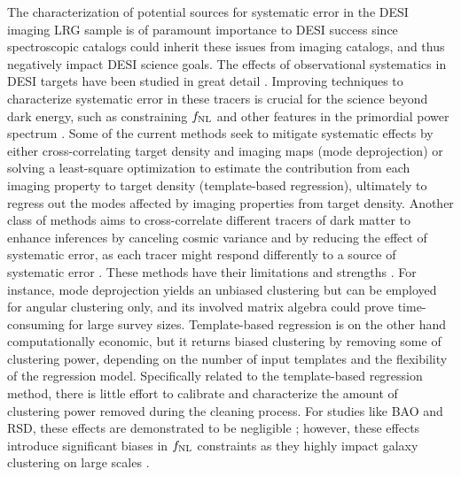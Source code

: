 The characterization of potential sources for systematic error in the DESI imaging LRG sample is of paramount importance to DESI success since spectroscopic catalogs could inherit these issues from imaging catalogs, and thus negatively impact DESI science goals. The effects of observational systematics in DESI targets have been studied in great detail \cite[see, e.g.,][]{kitanidis2020imaging, zhou2021clustering, chaussidon2022angular}. Improving techniques to characterize systematic error in these tracers is crucial for the science beyond dark energy, such as constraining $f_{\rm NL}$ and other features in the primordial power spectrum \citep{beutler2019primordial}. Some of the current methods seek to mitigate systematic effects by either cross-correlating target density and imaging maps (mode deprojection) or solving a least-square optimization to estimate the contribution from each imaging property to target density (template-based regression), ultimately to regress out the modes affected by imaging properties from target density. Another class of methods aims to cross-correlate different tracers of dark matter to enhance inferences by canceling cosmic variance and by reducing the effect of systematic error, as each tracer might respond differently to a source of systematic error \citep[see, e.g.,][]{giannantonio2014improved}. These methods have their limitations and strengths \citep[see, e.g.,][for a review]{2021MNRAS.503.5061W}. For instance, mode deprojection yields an unbiased clustering but can be employed for angular clustering only, and its involved matrix algebra could prove time-consuming for large survey sizes. Template-based regression is on the other hand computationally economic, but it returns biased clustering by removing some of clustering power, depending on the number of input templates and the flexibility of the regression model. Specifically related to the template-based regression method, there is little effort to calibrate and characterize the amount of clustering power removed during the cleaning process. For studies like BAO and RSD, these effects are demonstrated to be negligible \citep{merz2021clustering}; however, these effects introduce significant biases in $f_{\rm NL}$ constraints \citep{mueller2022primordial} as they highly impact galaxy clustering on large scales \citep{rezaie2021primordial}.  
 

